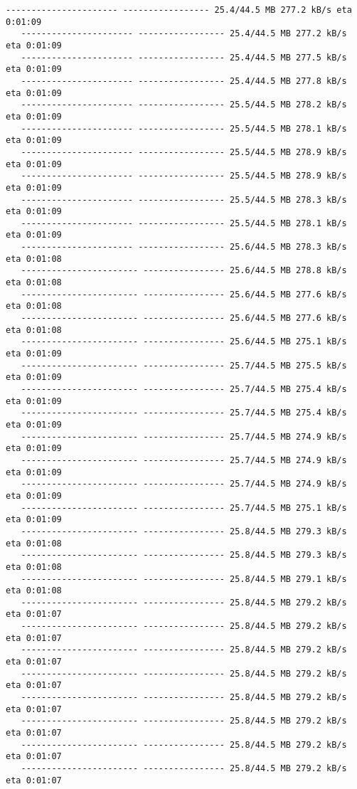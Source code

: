 \documentclass[11pt]{article}
\begin{document}
\begin{Verbatim}[commandchars=\\\{\}]
   ---------------------- ----------------- 25.4/44.5 MB 277.2 kB/s eta 0:01:09
   ---------------------- ----------------- 25.4/44.5 MB 277.2 kB/s eta 0:01:09
   ---------------------- ----------------- 25.4/44.5 MB 277.5 kB/s eta 0:01:09
   ---------------------- ----------------- 25.4/44.5 MB 277.8 kB/s eta 0:01:09
   ---------------------- ----------------- 25.5/44.5 MB 278.2 kB/s eta 0:01:09
   ---------------------- ----------------- 25.5/44.5 MB 278.1 kB/s eta 0:01:09
   ---------------------- ----------------- 25.5/44.5 MB 278.9 kB/s eta 0:01:09
   ---------------------- ----------------- 25.5/44.5 MB 278.9 kB/s eta 0:01:09
   ---------------------- ----------------- 25.5/44.5 MB 278.3 kB/s eta 0:01:09
   ---------------------- ----------------- 25.5/44.5 MB 278.1 kB/s eta 0:01:09
   ---------------------- ----------------- 25.6/44.5 MB 278.3 kB/s eta 0:01:08
   ----------------------- ---------------- 25.6/44.5 MB 278.8 kB/s eta 0:01:08
   ----------------------- ---------------- 25.6/44.5 MB 277.6 kB/s eta 0:01:08
   ----------------------- ---------------- 25.6/44.5 MB 277.6 kB/s eta 0:01:08
   ----------------------- ---------------- 25.6/44.5 MB 275.1 kB/s eta 0:01:09
   ----------------------- ---------------- 25.7/44.5 MB 275.5 kB/s eta 0:01:09
   ----------------------- ---------------- 25.7/44.5 MB 275.4 kB/s eta 0:01:09
   ----------------------- ---------------- 25.7/44.5 MB 275.4 kB/s eta 0:01:09
   ----------------------- ---------------- 25.7/44.5 MB 274.9 kB/s eta 0:01:09
   ----------------------- ---------------- 25.7/44.5 MB 274.9 kB/s eta 0:01:09
   ----------------------- ---------------- 25.7/44.5 MB 274.9 kB/s eta 0:01:09
   ----------------------- ---------------- 25.7/44.5 MB 275.1 kB/s eta 0:01:09
   ----------------------- ---------------- 25.8/44.5 MB 279.3 kB/s eta 0:01:08
   ----------------------- ---------------- 25.8/44.5 MB 279.3 kB/s eta 0:01:08
   ----------------------- ---------------- 25.8/44.5 MB 279.1 kB/s eta 0:01:08
   ----------------------- ---------------- 25.8/44.5 MB 279.2 kB/s eta 0:01:07
   ----------------------- ---------------- 25.8/44.5 MB 279.2 kB/s eta 0:01:07
   ----------------------- ---------------- 25.8/44.5 MB 279.2 kB/s eta 0:01:07
   ----------------------- ---------------- 25.8/44.5 MB 279.2 kB/s eta 0:01:07
   ----------------------- ---------------- 25.8/44.5 MB 279.2 kB/s eta 0:01:07
   ----------------------- ---------------- 25.8/44.5 MB 279.2 kB/s eta 0:01:07
   ----------------------- ---------------- 25.8/44.5 MB 279.2 kB/s eta 0:01:07
   ----------------------- ---------------- 25.8/44.5 MB 279.2 kB/s eta 0:01:07

\end{Verbatim}
\end{document}

